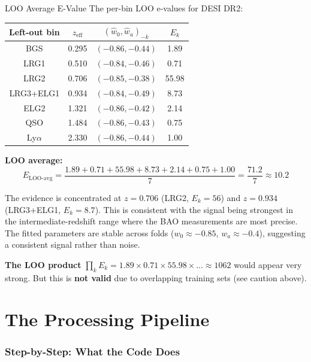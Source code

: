 \documentclass[11pt,a4paper]{article}
\begin{document}
\begin{examplebox}{LOO Average E-Value}
The per-bin LOO e-values for DESI DR2:

\begin{center}
\begin{tabular}{cccc}
\toprule
\textbf{Left-out bin} & $z_{\text{eff}}$ & $(\hat{w}_0, \hat{w}_a)_{-k}$ & $E_k$ \\
\midrule
BGS & 0.295 & $(-0.86, -0.44)$ & 1.89 \\
LRG1 & 0.510 & $(-0.84, -0.46)$ & 0.71 \\
LRG2 & 0.706 & $(-0.85, -0.38)$ & 55.98 \\
LRG3+ELG1 & 0.934 & $(-0.84, -0.49)$ & 8.73 \\
ELG2 & 1.321 & $(-0.86, -0.42)$ & 2.14 \\
QSO & 1.484 & $(-0.86, -0.43)$ & 0.75 \\
Ly$\alpha$ & 2.330 & $(-0.86, -0.44)$ & 1.00 \\
\bottomrule
\end{tabular}
\end{center}

\textbf{LOO average:}
$$E_{\text{LOO-avg}} = \frac{1.89 + 0.71 + 55.98 + 8.73 + 2.14 + 0.75 + 1.00}{7} = \frac{71.2}{7} \approx 10.2$$

The evidence is concentrated at $z = 0.706$ (LRG2, $E_k = 56$) and $z = 0.934$ (LRG3+ELG1, $E_k = 8.7$). This is consistent with the signal being strongest in the intermediate-redshift range where the BAO measurements are most precise. The fitted parameters are stable across folds ($w_0 \approx -0.85$, $w_a \approx -0.4$), suggesting a consistent signal rather than noise.

\textbf{The LOO product} $\prod_k E_k = 1.89 \times 0.71 \times 55.98 \times \ldots \approx 1062$ would appear very strong. But this is \textbf{not valid} due to overlapping training sets (see caution above).
\end{examplebox}


\part{The Processing Pipeline}

\section{Step-by-Step: What the Code Does}
\label{sec:pipeline}
\end{document}
